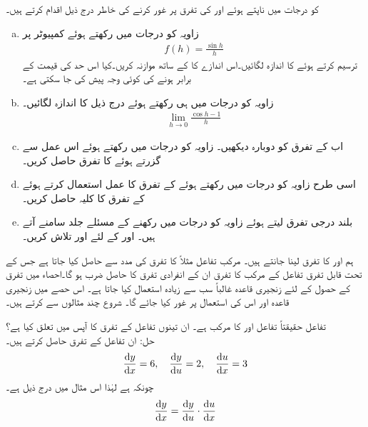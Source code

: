  کو درجات میں ناپتے ہوئے  اور  کی تفرق پر غور کرنے کی خاطر درج ذیل اقدام کرتے ہیں۔
\begin{enumerate}[a.]
\item
زاویہ کو درجات میں رکھتے ہوئے کمپیوٹر پر
\begin{align*}
f(h)=\frac{\sin h}{h}
\end{align*}
ترسیم کرتے ہوئے  کا اندازہ لگائیں۔اس اندازے کا  کے ساتھ موازنہ کریں۔کیا اس حد کی قیمت  کے برابر ہونے کی کوئی وجہ پیش کی جا سکتی ہے۔
\item
زاویہ کو درجات میں ہی رکھتے ہوئے درج ذیل کا اندازہ لگائیں۔
\begin{align*}
\lim_{h\to 0} \frac{\cos h-1}{h}
\end{align*}
\item
اب  کے تفرق کو دوبارہ دیکھیں۔ زاویہ کو درجات میں رکھتے ہوئے اس عمل سے گزرتے ہوئے  کا تفرق حاصل کریں۔
\item
اسی طرح زاویہ کو درجات میں رکھتے ہوئے  کے تفرق کا عمل استعمال کرتے ہوئے  کے تفرق کا کلیہ حاصل کریں۔
\item
بلند درجی تفرق لیتے ہوئے زاویہ کو درجات میں رکھنے کے مسئلے جلد سامنے آتے ہیں۔ اور  کے لئے  اور  تلاش کریں۔
\end{enumerate}

ہم  اور  کا تفرق لینا جانتے ہیں۔ مرکب تفاعل مثلاً  کا تفرق  کی مدد سے حاصل کیا جاتا ہے جس کے تحت قابل تفرق تفاعل کے مرکب کا تفرق ان کے انفرادی تفرق کا حاصل ضرب ہو گا۔احصاء  میں تفرق کے حصول کے لئے  زنجیری قاعدہ  غالباً سب سے زیادہ استعمال کیا جاتا ہے۔ اس حصے میں زنجیری قاعدہ اور اس کی استعمال پر غور کیا جائے گا۔ شروع چند مثالوں سے کرتے ہیں۔

تفاعل  حقیقتاً تفاعل  اور  کا مرکب ہے۔ ان تینوں تفاعل کے تفرق کا آپس میں تعلق کیا ہے؟\\
حل:\quad
ان تفاعل کے تفرق حاصل کرتے ہیں۔
\begin{align*}
\frac{\dif y}{\dif x}=6,\quad \frac{\dif y}{\dif u}=2,\quad \frac{\dif u}{\dif x}=3
\end{align*}
چونکہ  ہے لہٰذا اس مثال میں درج ذیل ہے۔
\begin{align*}
\frac{\dif y}{\dif x}=\frac{\dif y}{\dif u}\cdot \frac{\dif u}{\dif x}
\end{align*}

